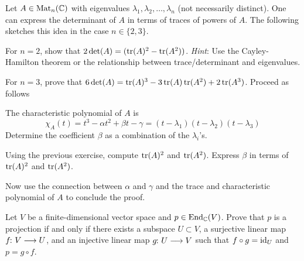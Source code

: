 \documentclass[a4paper, oneside, 12pt]{amsart}
\begin{document}
\begin{exercise}
  Let \(A \in \operatorname{Mat}_n(\mathbb{C})\) with eigenvalues \(\lambda_{1}, \lambda_{2}, \dots , \lambda_{n}\) (not necessarily distinct).
  One can express the determinant of \(A\) in terms of traces of powers of \(A\).
  The following sketches this idea in the case \(n\in\{2,3\}\).
  \begin{thmlist}
    \item For \(n=2\), show that \(2\det(A) = (\operatorname{tr}(A)^2 - \operatorname{tr}(A^2))\).
    \textit{Hint}: Use the Cayley-Hamilton theorem or the relationship between trace/determinant and eigenvalues.
  \end{thmlist}
  For \(n=3\), prove that \(6 \det(A) = \operatorname{tr}(A)^{3} - 3 \operatorname{tr}(A)\operatorname{tr}(A^{2}) + 2 \operatorname{tr}(A^{3})\).
  Proceed as follows
  \begin{thmlist}
    \item  The characteristic polynomial of \(A\) is
    \begin{equation*}
      \chi_{A}(t) = t^{3} - \alpha t^{2} + \beta t - \gamma = (t- \lambda_{1})(t- \lambda_{2})(t-\lambda_{3})
    \end{equation*}
    Determine the coefficient \(\beta\) as a combination of the \(\lambda_{i}\)'s.
    \item Using the previous exercise, compute  \(\operatorname{tr}(A)^{2}\) and \(\operatorname{tr}(A^{2})\).
    Express \(\beta\)  in terms of \(\operatorname{tr}(A)^{2}\) and \(\operatorname{tr}(A^{2})\).
    \item Now use the connection between \(\alpha\) and \(\gamma\) and the trace and characteristic polynomial of \(A\) to conclude the proof.
  \end{thmlist}
\end{exercise}


\begin{exercise}
  Let \(V\) be a finite-dimensional vector space and \(p \in \operatorname{End}_{\mathbb{C}}(V)\).
  Prove that \(p\) is a projection if and only if there exists a subspace \(U \subset V\), a surjective linear map \(f \from V \to U\), and an injective linear map \(g \from U \to V\) such that \(f \circ g = \mathrm{id}_U\) and \(p = g \circ f\).
\end{exercise}
\end{document}
